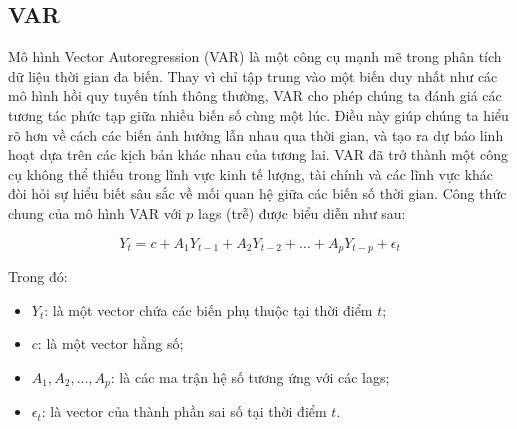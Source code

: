 \subsection{VAR}
Mô hình Vector Autoregression (VAR) là một công cụ mạnh mẽ trong phân tích dữ liệu thời gian đa biến. Thay vì chỉ tập trung vào một biến duy nhất như các mô hình hồi quy tuyến tính thông thường, VAR cho phép chúng ta đánh giá các tương tác phức tạp giữa nhiều biến số cùng một lúc. Điều này giúp chúng ta hiểu rõ hơn về cách các biến ảnh hưởng lẫn nhau qua thời gian, và tạo ra dự báo linh hoạt dựa trên các kịch bản khác nhau của tương lai. VAR đã trở thành một công cụ không thể thiếu trong lĩnh vực kinh tế lượng, tài chính và các lĩnh vực khác đòi hỏi sự hiểu biết sâu sắc về mối quan hệ giữa các biến số thời gian. Công thức chung của mô hình VAR với \( p \) lags (trễ) được biểu diễn như sau:

\[ Y_t = c + A_1 Y_{t-1} + A_2 Y_{t-2} + \ldots + A_p Y_{t-p} + \epsilon_t \]

Trong đó:
\begin{itemize}
  \item \( Y_t \): là một vector chứa các biến phụ thuộc tại thời điểm \( t \);
  \item \( c \): là một vector hằng số;
  \item \( A_1, A_2, \ldots, A_p \): là các ma trận hệ số tương ứng với các lags;
  \item \( \epsilon_t \): là vector của thành phần sai số tại thời điểm \( t \).
\end{itemize}